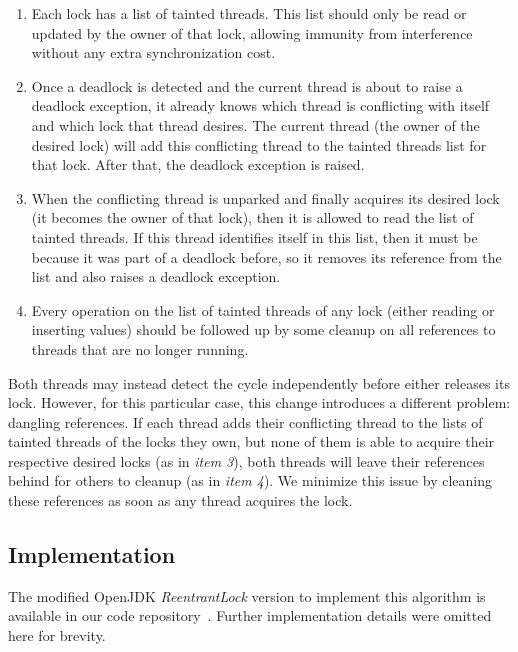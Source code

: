 \begin{enumerate}
\item Each lock has a list of tainted threads. This list should only be read or updated by the owner of that lock, allowing immunity from interference without any extra synchronization cost.
\item Once a deadlock is detected and the current thread is about to raise a deadlock exception, it already knows which thread is conflicting with itself and which lock that thread desires. The current thread (the owner of the desired lock) will add this conflicting thread to the tainted threads list for that lock. After that, the deadlock exception is raised.
\item When the conflicting thread is unparked and finally acquires its desired lock (it becomes the owner of that lock), then it is allowed to read the list of tainted threads. If this thread identifies itself in this list, then it must be because it was part of a deadlock before, so it removes its reference from the list and also raises a deadlock exception.
\item Every operation on the list of tainted threads of any lock (either reading or inserting values) should be followed up by some cleanup on all references to threads that are no longer running.
\end{enumerate}

Both threads may instead detect the cycle independently before either releases its lock. However, for this particular case, this change introduces a different problem: dangling references.
If each thread adds their conflicting thread to the lists of tainted threads of the locks they own, 
but none of them is able to acquire their respective desired locks (as in \emph{item 3}),
both threads will leave their references behind for others to cleanup (as in \emph{item 4}).
We minimize this issue by cleaning these references as soon as any thread acquires the lock.

\subsection{Implementation}

The modified OpenJDK \emph{ReentrantLock} version to implement this algorithm is available in our code repository~\cite{repo}. Further implementation details were omitted here for brevity.





